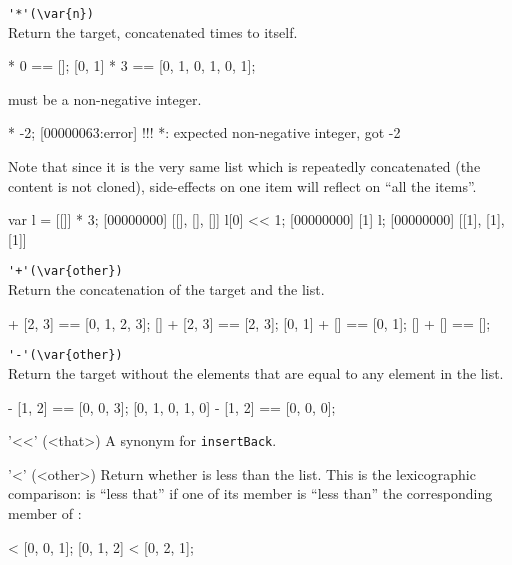 \begin{urbiscriptapi}
\item \lstinline|'*'(\var{n})|\\
  Return the target, concatenated  times to itself.
\begin{urbiassert}
[0, 1] * 0 == [];
[0, 1] * 3 == [0, 1, 0, 1, 0, 1];
\end{urbiassert}

   must be a non-negative integer.

\begin{urbiscript}
[0, 1] * -2;
[00000063:error] !!! *: expected non-negative integer, got -2
\end{urbiscript}


  Note that since it is the very same list which is repeatedly
  concatenated (the content is not cloned), side-effects on one item
  will reflect on ``all the items''.

\begin{urbiscript}
var l = [[]] * 3;
[00000000] [[], [], []]
l[0] << 1;
[00000000] [1]
l;
[00000000] [[1], [1], [1]]
\end{urbiscript}

\item \lstinline|'+'(\var{other})|\\
  Return the concatenation of the target and the  list.

\begin{urbiassert}
[0, 1] + [2, 3] == [0, 1, 2, 3];
[] + [2, 3] == [2, 3];
[0, 1] + [] == [0, 1];
[] + [] == [];
\end{urbiassert}

\item \lstinline|'-'(\var{other})|\\
  Return the target without the elements that are equal to any element
  in the  list.

\begin{urbiassert}
[0, 1, 0, 2, 3] - [1, 2] == [0, 0, 3];
[0, 1, 0, 1, 0] - [1, 2] == [0, 0, 0];
\end{urbiassert}

\item['<<'](<that>)%
  A synonym for \lstinline|insertBack|.

\item['<'](<other>)%
  Return whether \this is less than the  list.  This is the
  lexicographic comparison: \this is ``less that'' if one of its member is
  ``less than'' the corresponding member of :

\begin{urbiassert}
  [0, 0, 0] < [0, 0, 1];
  [0, 1, 2] < [0, 2, 1];


\end{urbiassert}
\end{urbiscriptapi}
